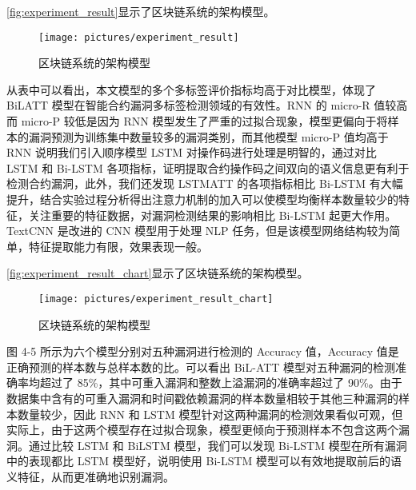 \autoref{fig:experiment_result}显示了区块链系统的架构模型。
\begin{figure}[htbp]
    \centering
    \texttt{[image: pictures/experiment\_result]}
    \caption{\label{fig:experiment_result}区块链系统的架构模型}
\end{figure}
从表中可以看出，本文模型的多个多标签评价指标均高于对比模型，体现了 BiLATT 模型在智能合约漏洞多标签检测领域的有效性。RNN 的 micro-R 值较高而 micro-P 较低是因为 RNN 模型发生了严重的过拟合现象，模型更偏向于将样本的漏洞预测为训练集中数量较多的漏洞类别，而其他模型 micro-P 值均高于 RNN 说明我们引入顺序模型 LSTM 对操作码进行处理是明智的，通过对比 LSTM 和 Bi-LSTM 各项指标，证明提取合约操作码之间双向的语义信息更有利于检测合约漏洞，此外，我们还发现 LSTMATT 的各项指标相比 Bi-LSTM 有大幅提升，结合实验过程分析得出注意力机制的加入可以使模型均衡样本数量较少的特征，关注重要的特征数据，对漏洞检测结果的影响相比 Bi-LSTM 起更大作用。TextCNN 是改进的 CNN 模型用于处理 NLP 任务，但是该模型网络结构较为简单，特征提取能力有限，效果表现一般。 

\autoref{fig:experiment_result_chart}显示了区块链系统的架构模型。
\begin{figure}[htbp]
    \centering
    \texttt{[image: pictures/experiment\_result\_chart]}
    \caption{\label{fig:experiment_result_chart}区块链系统的架构模型}
\end{figure}
图 4-5 所示为六个模型分别对五种漏洞进行检测的 Accuracy 值，Accuracy 值是正确预测的样本数与总样本数的比。可以看出 BiL-ATT 模型对五种漏洞的检测准确率均超过了 85\%，其中可重入漏洞和整数上溢漏洞的准确率超过了 90\%。由于数据集中含有的可重入漏洞和时间戳依赖漏洞的样本数量相较于其他三种漏洞的样本数量较少，因此 RNN 和 LSTM 模型针对这两种漏洞的检测效果看似可观，但实际上，由于这两个模型存在过拟合现象，模型更倾向于预测样本不包含这两个漏洞。通过比较 LSTM 和 BiLSTM 模型，我们可以发现 Bi-LSTM 模型在所有漏洞中的表现都比 LSTM 模型好，说明使用 Bi-LSTM 模型可以有效地提取前后的语义特征，从而更准确地识别漏洞。 

